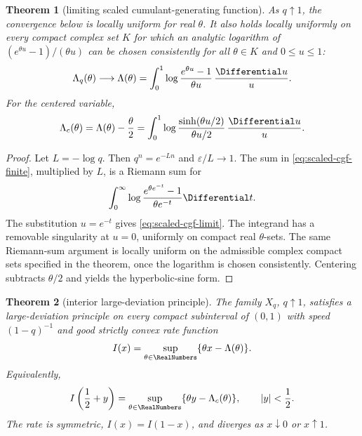 \documentclass[11pt]{article}
\newtheorem{theorem}{Theorem}[section]
\theoremstyle{definition}
\theoremstyle{remark}
\newcommand{\eps}{\varepsilon}
\begin{document}
\begin{theorem}[limiting scaled cumulant-generating function]\label{thm:scaled-cgf}
As $q\uparrow1$, the convergence below is locally uniform for real $\theta$.  It also holds locally uniformly on every compact complex set $K$ for which an analytic logarithm of $(e^{\theta u}-1)/(\theta u)$ can be chosen consistently for all $\theta\in K$ and $0\le u\le1$:
\begin{equation}\label{eq:scaled-cgf-limit}
 \Lambda_q(\theta)\longrightarrow
 \Lambda(\theta)=\int_0^1
 \log\frac{e^{\theta u}-1}{\theta u}\,\frac{\Differential u}{u}.
\end{equation}
For the centered variable,
\begin{equation}\label{eq:centered-scaled-cgf}
 \Lambda_c(\theta)=\Lambda(\theta)-\frac\theta2
 =\int_0^1\log\frac{\sinh(\theta u/2)}{\theta u/2}\,\frac{\Differential u}{u}.
\end{equation}
\end{theorem}

\begin{proof}
Let $L=-\log q$.  Then $q^n=e^{-Ln}$ and $\eps/L\to1$.  The sum in \cref{eq:scaled-cgf-finite}, multiplied by $L$, is a Riemann sum for
\[
 \int_0^\infty \log\frac{e^{\theta e^{-t}}-1}{\theta e^{-t}}\Differential t.
\]
The substitution $u=e^{-t}$ gives \cref{eq:scaled-cgf-limit}.  The integrand has a removable singularity at $u=0$, uniformly on compact real $\theta$-sets.  The same Riemann-sum argument is locally uniform on the admissible complex compact sets specified in the theorem, once the logarithm is chosen consistently.  Centering subtracts $\theta/2$ and yields the hyperbolic-sine form.
\end{proof}

\begin{theorem}[interior large-deviation principle]\label{thm:ldp}
The family $X_q$, $q\uparrow1$, satisfies a large-deviation principle on every compact subinterval of $(0,1)$ with speed $(1-q)^{-1}$ and good strictly convex rate function
\begin{equation}\label{eq:rate-function}
 I(x)=\sup_{\theta\in\RealNumbers}\{\theta x-\Lambda(\theta)\}.
\end{equation}
Equivalently,
\begin{equation}\label{eq:centered-rate}
 I\left(\frac12+y\right)
 =\sup_{\theta\in\RealNumbers}\{\theta y-\Lambda_c(\theta)\},
 \qquad |y|<\frac12.
\end{equation}
The rate is symmetric, $I(x)=I(1-x)$, and diverges as $x\downarrow0$ or $x\uparrow1$.
\end{theorem}
\end{document}
